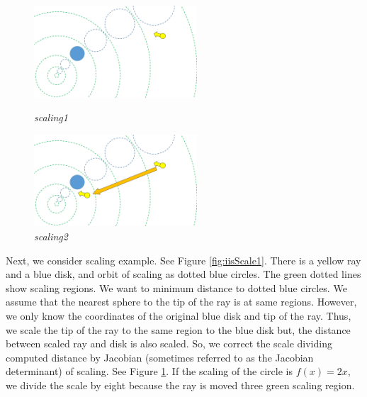 \begin{figure}[htbp]
 \begin{minipage}[t]{0.5\hsize}
  \center
  \includegraphics[height=1.35in, keepaspectratio]{img/preparation/iis3d/scaleIIS.png}
  \caption{\textit{scaling1}}
  \label{fig:iisScale1}
  \hspace*{\fill}
 \end{minipage}
 \begin{minipage}[t]{0.5\hsize}
  \center
  \includegraphics[height=1.35in, keepaspectratio]{img/preparation/iis3d/scaleIIS2.png}
  \caption{\textit{scaling2}}
  \label{fig:iisScale2}
  \hspace*{\fill}
 \end{minipage}
\end{figure}

Next, we consider scaling example. See Figure \ref{fig:iisScale1}.
There is a yellow ray and a blue disk, and orbit of scaling as
dotted blue circles.
The green dotted lines show scaling regions.
We want to minimum distance to dotted blue circles.
We assume that the nearest sphere to the tip of the ray is at
same regions. 
However, we only know the coordinates of the original blue
disk and tip of the ray.
Thus, we scale the tip of the ray to the same region to the blue disk
but, the distance between scaled ray and disk is also scaled.
So, we correct the scale dividing computed distance by 
Jacobian (sometimes referred to as the Jacobian determinant) of scaling.
See Figure \ref{fig:iisScale2}.
If the scaling of the circle is $f(x) = 2x$, we divide the scale by
eight because the ray is moved three green scaling region.

